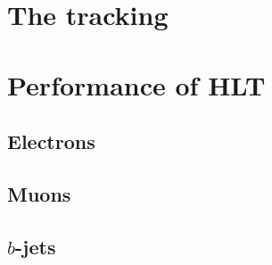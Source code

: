 	\section{The tracking}
	\label{sec:tracking}



	\section{Performance of HLT}
	\label{sec:Trig_perf}

		\subsection{Electrons}

		\subsection{Muons}

		\subsection{$b$-jets}

